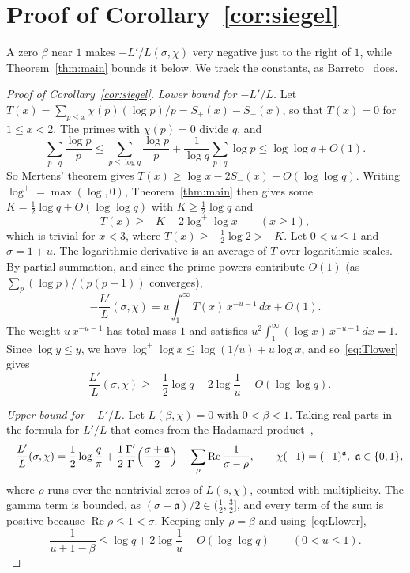 \documentclass[11pt]{amsart}
\theoremstyle{remark}
\begin{document}
\section{Proof of Corollary~\ref{cor:siegel}}\label{sec:cor}

A zero $\beta$ near $1$ makes $-L'/L(\sigma,\chi)$ very negative just to the right of $1$, while
Theorem~\ref{thm:main} bounds it below. We track the constants, as Barreto~\cite{Barreto} does.

\begin{proof}[Proof of Corollary~\ref{cor:siegel}]
\emph{Lower bound for $-L'/L$.} Let $T(x)=\sum_{p\le x}\chi(p)(\log p)/p=S_+(x)-S_-(x)$, so that $T(x)=0$ for
$1\le x<2$. The primes with $\chi(p)=0$ divide $q$, and
\[
\sum_{p\mid q}\frac{\log p}p\le\sum_{p\le\log q}\frac{\log p}p+\frac1{\log q}\sum_{p\mid q}\log p
\le\log\log q+O(1).
\]
So Mertens' theorem gives $T(x)\ge\log x-2S_-(x)-O(\log\log q)$. Writing $\log^+=\max(\log,0)$,
Theorem~\ref{thm:main} then gives some $K=\frac12\log q+O(\log\log q)$ with $K\ge\frac12\log q$ and
\begin{equation}\label{eq:Tlower}
T(x)\ge-K-2\log^+\log x\qquad(x\ge1),
\end{equation}
which is trivial for $x<3$, where $T(x)\ge-\frac12\log2>-K$. Let $0<u\le1$ and $\sigma=1+u$. The
logarithmic derivative is an average of $T$ over logarithmic scales. By partial summation, and since
the prime powers contribute $O(1)$ (as $\sum_p(\log p)/(p(p-1))$ converges),
\[
-\frac{L'}{L}(\sigma,\chi)=u\int_1^\infty T(x)\,x^{-u-1}\,dx+O(1).
\]
The weight $u\,x^{-u-1}$ has total mass $1$ and satisfies $u^2\int_1^\infty(\log x)\,x^{-u-1}\,dx=1$.
Since $\log y\le y$, we have $\log^+\log x\le\log(1/u)+u\log x$, and so~\eqref{eq:Tlower} gives
\begin{equation}\label{eq:Llower}
-\frac{L'}{L}(\sigma,\chi)\ge-\frac12\log q-2\log\frac1u-O(\log\log q).
\end{equation}

\emph{Upper bound for $-L'/L$.} Let $L(\beta,\chi)=0$ with $0<\beta<1$. Taking real parts in the formula for
$L'/L$ that comes from the Hadamard
product~\cite[Ch.~12, (17)--(18), and Ch.~14, p.~89, (2)]{Davenport},
\[
-\frac{L'}{L}(\sigma,\chi)=\frac12\log\frac q\pi
+\frac12\frac{\Gamma'}{\Gamma}\Bigl(\frac{\sigma+\mathfrak a}2\Bigr)
-\sum_\rho\operatorname{Re}\frac1{\sigma-\rho},\qquad \chi(-1)=(-1)^{\mathfrak a},\ \mathfrak a\in\{0,1\},
\]
where $\rho$ runs over the nontrivial zeros of $L(s,\chi)$, counted with multiplicity. The gamma
term is bounded, as $(\sigma+\mathfrak a)/2\in(\frac12,\frac32]$, and every term of the sum is
positive because $\operatorname{Re}\rho\le1<\sigma$. Keeping only $\rho=\beta$ and using~\eqref{eq:Llower},
\begin{equation}\label{eq:key}
\frac1{u+1-\beta}\le\log q+2\log\frac1u+O(\log\log q)\qquad(0<u\le1).
\end{equation}


\end{proof}
\end{document}
